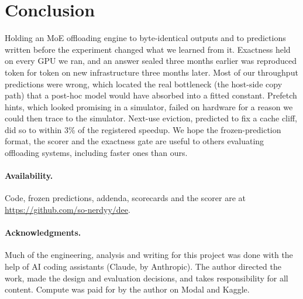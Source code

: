 \documentclass[11pt]{article}
\begin{document}
\section{Conclusion}

Holding an MoE offloading engine to byte-identical outputs and to predictions
written before the experiment changed what we learned from it. Exactness held
on every GPU we ran, and an answer sealed three months earlier was reproduced token for token
on new infrastructure three months later. Most of our throughput predictions were wrong, which
located the real bottleneck (the host-side copy path) that a post-hoc model
would have absorbed into a fitted constant. Prefetch hints, which looked
promising in a simulator, failed on hardware for a reason we could then trace
to the simulator. Next-use eviction, predicted to fix a cache cliff, did so to
within 3\% of the registered speedup. We hope the frozen-prediction format,
the scorer and the exactness gate are useful to others evaluating offloading
systems, including faster ones than ours.

\paragraph{Availability.} Code, frozen predictions, addenda, scorecards and the
scorer are at \url{https://github.com/so-nerdyy/dee}. %

\paragraph{Acknowledgments.} Much of the engineering, analysis and writing for
this project was done with the help of AI coding assistants (Claude, by
Anthropic). The author directed the work, made the design and evaluation
decisions, and takes responsibility for all content. Compute was paid for by the
author on Modal and Kaggle.



\end{document}
